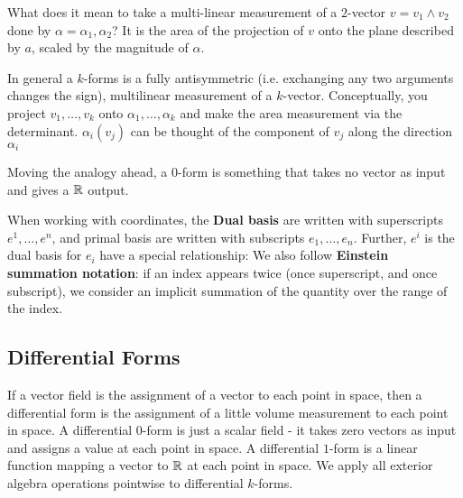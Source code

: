 \begin{definition}[$k$-forms]
    What does it mean to take a multi-linear measurement of a $2$-vector $v = v_1\wedge v_2$ done by $\alpha = \alpha_1,\alpha_2$? It is the area of the projection of $v$ onto the plane described by $a$, scaled by the magnitude of $\alpha$.
    
    
    In general a $k$-forms is a fully antisymmetric (i.e. exchanging any two arguments changes the sign), multilinear measurement of a $k$-vector. Conceptually, you project $v_1,\dotsc,v_k$ onto $\alpha_1,\dotsc,\alpha_k$ and make the area measurement via the determinant.
    $\alpha_i(v_j)$ can be thought of the component of $v_j$ along the direction $\alpha_i$
\end{definition}

Moving the analogy ahead, a $0$-form is something that takes no vector as input and gives a $\mathbb{R}$ output.

When working with coordinates, the \textbf{Dual basis} are written with superscripts $e^1,\dotsc,e^n$, and primal basis are written with subscripts $e_1,\dotsc,e_n$. Further, $e^i$ is the dual basis for $e_i$ have a special relationship:
We also follow \textbf{Einstein summation notation}: if an index appears twice (once superscript, and once subscript), we consider an implicit summation of the quantity over the range of the index.


\subsection{Differential Forms}
If a vector field is the assignment of a vector to each point in space, then a differential form is the assignment of a little volume measurement to each point in space. A differential $0$-form is just a scalar field - it takes zero vectors as input and assigns a value at each point in space. A differential $1$-form is a linear function mapping a vector to $\mathbb{R}$ at each point in space. We apply all exterior algebra operations pointwise to differential $k$-forms.

